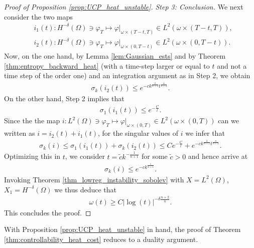 \documentclass[12pt,twoside]{amsart}
\numberwithin{equation}{section}
\renewcommand{\leq}{\leqslant}
\renewcommand{\geq}{\geqslant}
\begin{document}
\begin{proof}[Proof of Proposition \ref{prop:UCP_heat_unstable}]
\emph{Step 3: Conclusion.}
We next consider the two maps
\begin{align*}
&i_1(t): H^{-\delta}(\Omega ) \ni \varphi_T \mapsto \varphi|_{\omega \times (T-t,T)} \in L^2(\omega \times (T-t,T)),\\
&i_2(t):  H^{-\delta}(\Omega ) \ni \varphi_T \mapsto \varphi|_{\omega \times (0,T-t)} \in L^2(\omega \times (0,T-t)).
\end{align*}
Now, on the one hand, by Lemma \ref{lem:Gaussian_ests} and by Theorem \ref{thm:entropy_backward_heat} (with a time-step larger or equal to $t$ and not a time step of the order one) and an integration argument as in Step 2, we obtain
\begin{align}
\label{eq:i2}
\sigma_k(i_2(t)) \leq e^{-c k^{\frac{2}{n+2}} t^{\frac{n}{n+2}}}.
\end{align}
On the other hand, Step 2 implies that 
\begin{align}
\label{eq:i1}
\sigma_1(i_1(t)) \leq e^{-\frac{C}{t}}.
\end{align}
Since the the map $i: L^{2}(\Omega) \ni \varphi_T \mapsto \varphi|_{\omega \times (0,T)} \in L^2(\omega \times (0,T))$ can we written as $i = i_2(t) + i_1(t)$, for the singular values of $i$ we infer that
\begin{align*}
\sigma_k(i) \leq \sigma_1(i_1(t)) + \sigma_k(i_2(t))
\leq Ce^{-\frac{C}{t}} + e^{-c k^{\frac{2}{n+2}} t^{\frac{n}{n+2}}}.
\end{align*}
Optimizing this in $t$, we consider $t= \tilde{c} k^{- \frac{1}{n+1}}$ for some $\tilde{c}>0$ and hence arrive at
\begin{align*}
\sigma_k(i) \leq e^{-c k^{\frac{1}{n+1}}}.
\end{align*}
Invoking Theorem \ref{thm_lowreg_instability_sobolev} with $X=L^2(\Omega)$, $X_1 = H^{-\delta}(\Omega)$ we thus deduce that
\begin{align*}
\omega(t) \geq C |\log(t)|^{- \delta \frac{n+2}{n}}.
\end{align*}
This concludes the proof.
\end{proof}


With Proposition \ref{prop:UCP_heat_unstable} in hand, the proof of Theorem \ref{thm:controllability_heat_cost} reduces to a duality argument.
\end{document}
